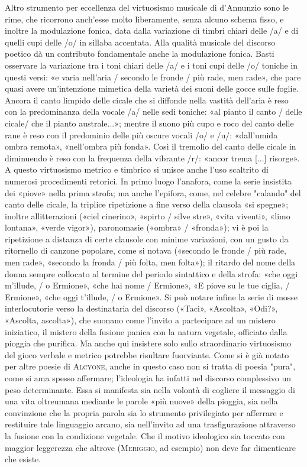 \documentclass{book}
\newcounter{mar}
\begin{document}
Altro strumento per eccellenza del virtuosismo musicale di d'Annunzio sono le rime, che ricorrono anch'esse molto liberamente, senza alcuno schema fisso, e inoltre la modulazione fonica, data dalla variazione di timbri chiari delle /a/ e di quelli cupi delle /o/ in sillaba accentata. Alla qualità musicale del discorso poetico dà un contributo fondamentale anche la modulazione fonica. Basti osservare la variazione tra i toni chiari delle /a/ e i toni cupi delle /o/ toniche in questi versi: «e varia nell'aria / secondo le fronde / più rade, men rade», che pare quasi avere un'intenzione mimetica della varietà dei suoni delle gocce sulle foglie. Ancora il canto limpido delle cicale che si diffonde nella vastità dell'aria è reso con la predominanza della vocale /a/ nelle sedi toniche: «al pianto il canto / delle cicale/ che il pianto australe...»; mentre il suono più cupo e roco del canto delle rane è reso con il predominio delle più oscure vocali /o/ e /u/: «dall'umida ombra remota», «nell'ombra più fonda». Così il tremolio del canto delle cicale in diminuendo è reso con la frequenza della vibrante /r/: «ancor trema [...] risorge». A questo virtuosismo metrico e timbrico si unisce anche l'uso scaltrito di numerosi procedimenti retorici. In primo luogo l'anafora, come la serie insistita dei «piove» nella prima strofa; ma anche l'epifora, come, nel celebre "calando" del canto delle cicale, la triplice ripetizione a fine verso della clausola «si spegne»; inoltre allitterazioni («ciel cinerino», «spirto / silve stre», «vita viventi», «limo lontana», «verde vigor»), paronomasie («ombra» / «fronda»); vi è poi la ripetizione a distanza di certe clausole con minime variazioni, con un gusto da ritornello di canzone popolare, come si notava («secondo le fronde / più rade, men rade», «secondo la fronda / più folta, men folta»); il ritardo del nome della donna sempre collocato al termine del periodo sintattico e della strofa: «che oggi m'illude, / o Ermione», «che hai nome / Ermione», «E piove su le tue ciglia, / Ermione», «che oggi t'illude, / o Ermione». Si può notare infine la serie di mosse interlocutorie verso la destinataria del discorso («Taci», «Ascolta», «Odi?», «Ascolta, ascolta»), che suonano come l'invito a partecipare ad un mistero iniziatico, il mistero della fusione panica con la natura vegetale, officiato dalla pioggia che purifica. Ma anche qui insistere solo sullo straordinario virtuosismo del gioco verbale e metrico potrebbe risultare fuorviante. Come si è già notato per altre poesie di \textsc{Alcyone}, anche in questo caso non si tratta di poesia "pura", come si ama spesso affermare; l'ideologia ha infatti nel discorso complessivo un peso determinante. Essa si manifesta sia nella volontà di cogliere il messaggio di una vita oltreumana mediante le parole «più nuove» della pioggia, sia nella convinzione che la propria parola sia lo strumento privilegiato per afferrare e restituire tale linguaggio arcano, sia nell'invito ad una trasfigurazione attraverso la fusione con la condizione vegetale. Che il motivo ideologico sia toccato con maggior leggerezza che altrove (\textsc{Meriggio}, ad esempio) non deve far dimenticare che esiste.
\end{document}
